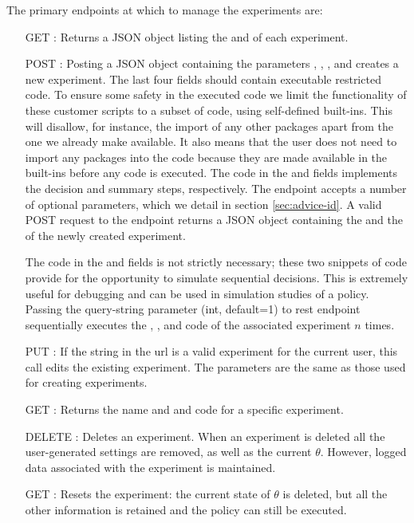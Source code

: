 \documentclass[nojss]{jss}
\begin{document}
The primary endpoints at which to manage the experiments are: 

\begin{itemize}
\item [GET] : Returns a JSON object listing the  and  of each experiment.
\item [POST] : Posting a JSON object containing the parameters , , ,  and  creates a new experiment. The last four fields should contain executable restricted  code. To ensure some safety in the executed code we limit the functionality of these customer scripts to a subset of  code, using self-defined built-ins. This will disallow, for instance, the import of any other packages apart from the one we already make available. It also means that the user does not need to import any packages into the code because they are made available in the built-ins before any code is executed. The code in the  and  fields implements the decision and summary steps, respectively. The  endpoint accepts a number of optional parameters, which we detail in section \ref{sec:advice-id}. A valid POST request to the  endpoint returns a JSON object containing the  and the  of the newly created experiment.

The code in the  and  fields is not strictly necessary; these two snippets of code provide for the opportunity to simulate sequential decisions. This is extremely useful for debugging and can be used in simulation studies of a policy. Passing the query-string parameter  (int, default=1) to rest endpoint  sequentially executes the , ,  and  code of the associated experiment $n$ times.
\item [PUT] : If the  string in the url is a valid experiment for the current user, this call edits the existing experiment. The parameters are the same as those used for creating experiments.
\item [GET] : Returns the name and  and  code for a specific experiment.
\item [DELETE] : Deletes an experiment. When an experiment is deleted all the user-generated settings are removed, as well as the current $\theta$. However, logged data associated with the experiment is maintained.
\item [GET] : Resets the experiment: the current state of $\theta$ is deleted, but all the other information is retained and the policy can still be executed.
\end{itemize}
\end{document}
